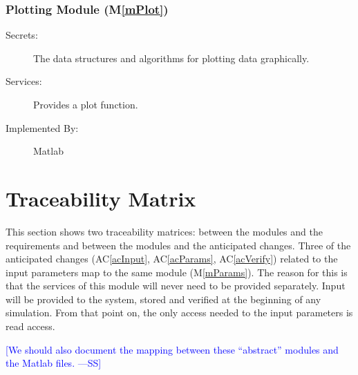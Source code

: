 \documentclass[12pt]{article}
\newcommand{\authornote}[3]{\textcolor{#1}{[#3 ---#2]}}
\newcommand{\authornote}[3]{}
\newcommand{\wss}[1]{\authornote{blue}{SS}{#1}}
\newcommand{\acref}[1]{AC\ref{#1}}
\newcommand{\mref}[1]{M\ref{#1}}
\begin{document}
\subsubsection{Plotting Module (\mref{mPlot})}

\begin{description}
\item[Secrets:] The data structures and algorithms for plotting data graphically.
\item[Services:] Provides a plot function.
\item[Implemented By:] Matlab
\end{description}

\section{Traceability Matrix} \label{SecTM}

This section shows two traceability matrices: between the modules and the
requirements and between the modules and the anticipated changes.  Three of the
anticipated changes (\acref{acInput}, \acref{acParams}, \acref{acVerify})
related to the input parameters map to the same module (\mref{mParams}).  The
reason for this is that the services of this module will never need to be
provided separately.  Input will be provided to the system, stored and verified
at the beginning of any simulation.  From that point on, the only access needed
to the input parameters is read access.

\wss{We should also document the mapping between these ``abstract'' modules and
  the Matlab files.}
\end{document}
